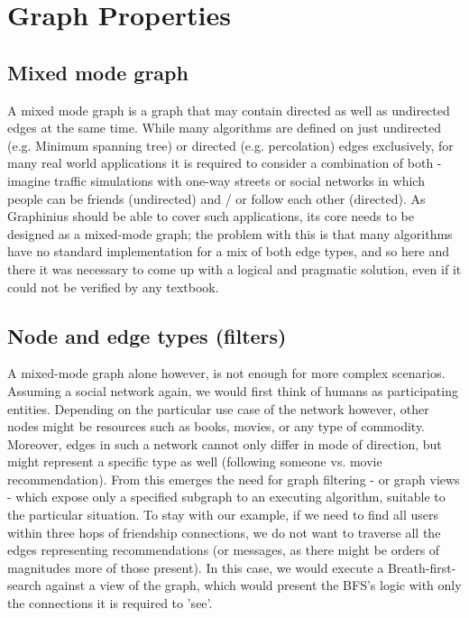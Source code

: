 \section{Graph Properties}
\label{sect:graph_properties}

	\subsection{Mixed mode graph}
	\label{ssect:mixedmode}
	A mixed mode graph is a graph that may contain directed as well as undirected edges at the same time. While many algorithms are defined on just undirected (e.g. Minimum spanning tree) or directed (e.g. percolation) edges exclusively, for many real world applications it is required to consider a combination of both - imagine traffic simulations with one-way streets or social networks in which people can be friends (undirected) and / or follow each other (directed). As Graphinius should be able to cover such applications, its core needs to be designed as a mixed-mode graph; the problem with this is that many algorithms have no standard implementation for a mix of both edge types, and so here and there it was necessary to come up with a logical and pragmatic solution, even if it could not be verified by any textbook.
	
	
	\subsection{Node and edge types (filters)}
	\label{ssect:node_types}	
	A mixed-mode graph alone however, is not enough for more complex scenarios. Assuming a social network again, we would first think of humans as participating entities. Depending on the particular use case of the network however, other nodes might be resources such as books, movies, or any type of commodity. Moreover, edges in such a network cannot only differ in mode of direction, but might represent a specific type as well (following someone vs. movie recommendation). From this emerges the need for graph filtering - or graph views - which expose only a specified subgraph to an executing algorithm, suitable to the particular situation. To stay with our example, if we need to find all users within three hops of friendship connections, we do not want to traverse all the edges representing recommendations (or messages, as there might be orders of magnitudes more of those present). In this case, we would execute a Breath-first-search against a view of the graph, which would present the BFS's logic with only the connections it is required to 'see'.
	
